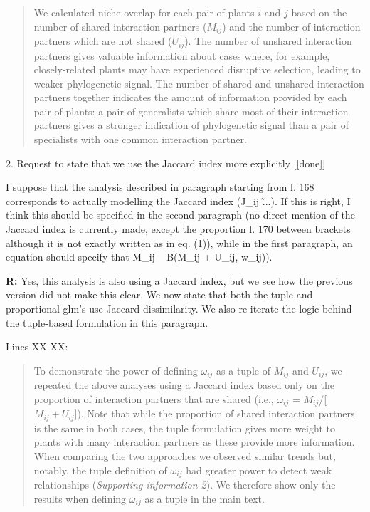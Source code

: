 \documentclass[12pt]{letter}
\newenvironment{refquote}{\bigskip \begin{it}}{\end{it}\smallskip}
\begin{document}
		\begin{quotation}

		    We calculated niche overlap for each pair of plants $i$ and $j$ based on the number of shared interaction
		    partners ($M_{ij}$) and the number of interaction partners which are not
		    shared ($U_{ij}$). The number of unshared interaction 
		    partners gives valuable information about cases where, for example, 
		    closely-related plants may have experienced disruptive selection, leading to weaker phylogenetic signal. The number of shared and unshared interaction partners together indicates the amount of information  provided by each pair of plants: a pair of generalists which share most of their interaction partners gives a stronger indication of phylogenetic signal than a pair of specialists with one common interaction partner.

		\end{quotation} 


	2. Request to state that we use the Jaccard index more explicitly [[done]]

		\begin{refquote}
			I suppose that the analysis described in paragraph starting from l. 168 corresponds to actually modelling the Jaccard index (J\_ij \~ ...). If this is right, I think this should be specified in the second paragraph (no direct mention of the Jaccard index is currently made, except the proportion l. 170 between brackets although it is not exactly written as in eq. (1)), while in the first paragraph, an equation should specify that M\_ij ~ B(M\_ij + U\_ij, w\_ij)).
		\end{refquote}


		\textbf{R:} Yes, this analysis is also using a Jaccard index, but we see how the previous version did not make this clear. We now state that both the tuple and proportional glm's use Jaccard dissimilarity. We also re-iterate the logic behind the tuple-based formulation in this paragraph.


			Lines XX-XX:


			\begin{quotation}

				To demonstrate the power of defining $\omega_{ij}$ as a tuple of $M_{ij}$ and $U_{ij}$, we repeated the above analyses using a Jaccard index based only on the proportion of interaction partners that are shared (i.e., $\omega_{ij}$ = $M_{ij}$/[$M_{ij}+U_{ij}$]). Note that while the proportion of shared interaction partners is the same in both cases, the tuple formulation gives more weight to plants with many interaction partners as these provide more information. When comparing the two approaches 
			    we observed similar trends but, notably, the tuple definition of $\omega_{ij}$ had greater power to detect weak relationships (\emph{Supporting information 2}). We therefore show only the results when defining $\omega_{ij}$ as a tuple in the main text.

			\end{quotation}
\end{document}

